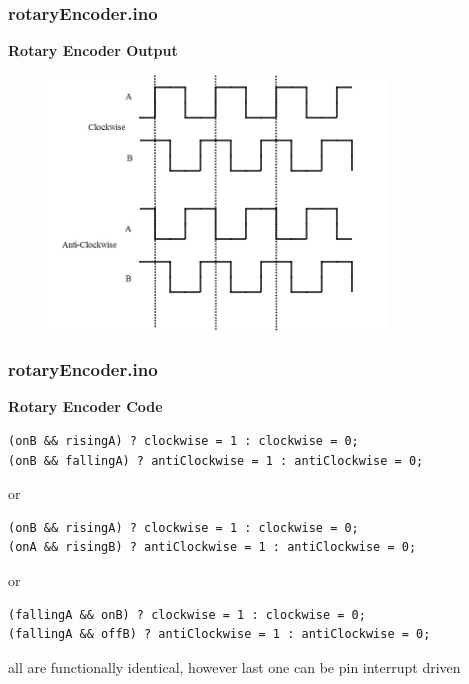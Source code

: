 \documentclass[t]{beamer}
\begin{document}
\begin{frame}[t]
\frametitle{rotaryEncoder.ino}
\textbf{Rotary Encoder Output}

\begin{figure}
	\includegraphics[width=0.8\textwidth]{Rotary-Encoder-Output.jpg}
\end{figure}


\end{frame}


\begin{frame}[t,fragile]
\frametitle{rotaryEncoder.ino}
\textbf{Rotary Encoder Code}

\begin{verbatim}
(onB && risingA) ? clockwise = 1 : clockwise = 0;
(onB && fallingA) ? antiClockwise = 1 : antiClockwise = 0;
\end{verbatim}
or
\begin{verbatim}
(onB && risingA) ? clockwise = 1 : clockwise = 0;
(onA && risingB) ? antiClockwise = 1 : antiClockwise = 0;
\end{verbatim}
or
\begin{verbatim}
(fallingA && onB) ? clockwise = 1 : clockwise = 0;
(fallingA && offB) ? antiClockwise = 1 : antiClockwise = 0;
\end{verbatim}

all are functionally identical, however last one can be pin interrupt driven


\end{frame}

\end{document}
